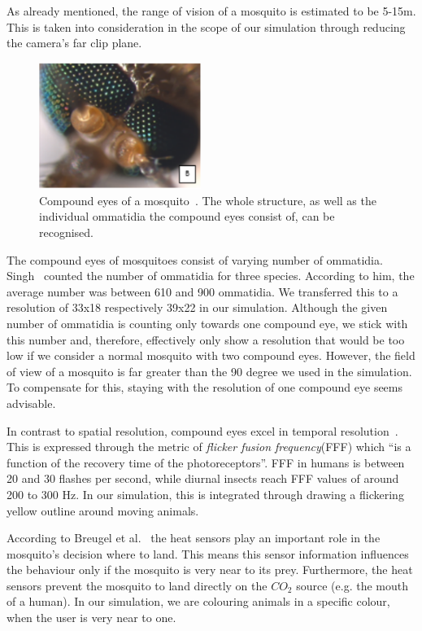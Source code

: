 \documentclass{sig-alternate-05-2015}
\begin{document}
As already mentioned, the range of vision of a mosquito is estimated to be 5-15m. This is taken into consideration in the scope of our simulation through reducing the camera's far clip plane.

\begin{figure}[h!]
\includegraphics[width=0.47\textwidth]{Figures/compoundeye_real.png}
\caption{Compound eyes of a mosquito~\cite{singh2013}. The whole structure, as well as the individual ommatidia the compound eyes consist of, can be recognised. }
\label{fig:compoundeye_real}
\end{figure}

The compound eyes of mosquitoes consist of varying number of ommatidia. Singh~\cite{singh2013} counted the number of ommatidia for three species. According to him, the average number was between 610 and 900 ommatidia. We transferred this to a resolution of 33x18 respectively 39x22 in our simulation. Although the given number of ommatidia is counting only towards one compound eye, we stick with this number and, therefore, effectively only show a resolution that would be too low if we consider a normal mosquito with two compound eyes. However, the field of view of a mosquito is far greater than the 90 degree we used in the simulation. To compensate for this, staying with the resolution of one compound eye seems advisable.



In contrast to spatial resolution, compound eyes excel in temporal resolution~\cite{lehane2005}. This is expressed through the metric of \textit{flicker fusion frequency}(FFF) which ``is a function of the recovery time of the photoreceptors''. FFF in humans is between 20 and 30 flashes per second, while diurnal insects reach FFF values of around 200 to 300 Hz. In our simulation, this is integrated through drawing a flickering yellow outline around moving animals.

According to Breugel et al.~\cite{breugel2015} the heat sensors play an important role in the mosquito's decision where to land. This means this sensor information influences the behaviour only if the mosquito is very near to its prey. Furthermore, the heat sensors prevent the mosquito to land directly on the $CO_2$ source (e.g. the mouth of a human). In our simulation, we are colouring animals in a specific colour, when the user is very near to one. 
\end{document}
